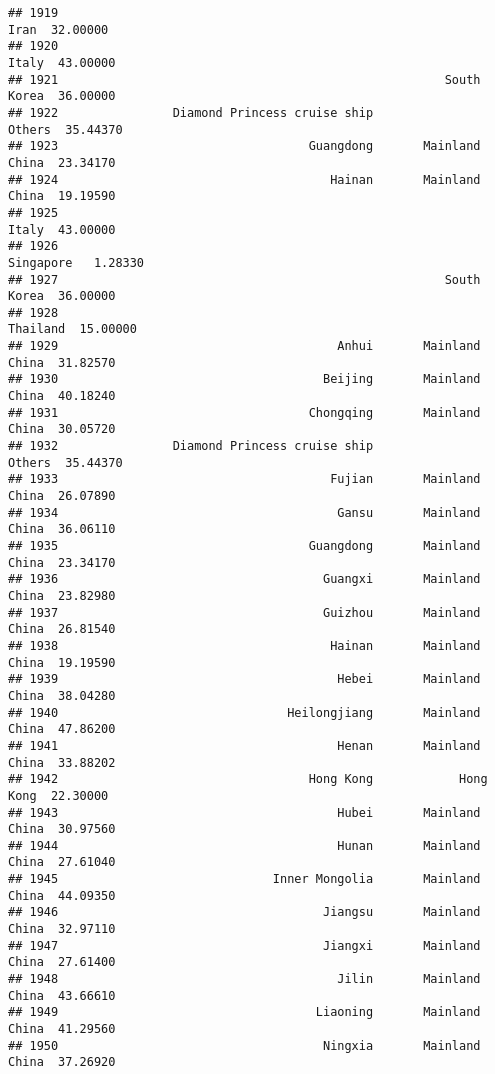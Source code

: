 \documentclass[
]{article}
\begin{document}
\begin{verbatim}
## 1919                                                             Iran  32.00000
## 1920                                                            Italy  43.00000
## 1921                                                      South Korea  36.00000
## 1922                Diamond Princess cruise ship               Others  35.44370
## 1923                                   Guangdong       Mainland China  23.34170
## 1924                                      Hainan       Mainland China  19.19590
## 1925                                                            Italy  43.00000
## 1926                                                        Singapore   1.28330
## 1927                                                      South Korea  36.00000
## 1928                                                         Thailand  15.00000
## 1929                                       Anhui       Mainland China  31.82570
## 1930                                     Beijing       Mainland China  40.18240
## 1931                                   Chongqing       Mainland China  30.05720
## 1932                Diamond Princess cruise ship               Others  35.44370
## 1933                                      Fujian       Mainland China  26.07890
## 1934                                       Gansu       Mainland China  36.06110
## 1935                                   Guangdong       Mainland China  23.34170
## 1936                                     Guangxi       Mainland China  23.82980
## 1937                                     Guizhou       Mainland China  26.81540
## 1938                                      Hainan       Mainland China  19.19590
## 1939                                       Hebei       Mainland China  38.04280
## 1940                                Heilongjiang       Mainland China  47.86200
## 1941                                       Henan       Mainland China  33.88202
## 1942                                   Hong Kong            Hong Kong  22.30000
## 1943                                       Hubei       Mainland China  30.97560
## 1944                                       Hunan       Mainland China  27.61040
## 1945                              Inner Mongolia       Mainland China  44.09350
## 1946                                     Jiangsu       Mainland China  32.97110
## 1947                                     Jiangxi       Mainland China  27.61400
## 1948                                       Jilin       Mainland China  43.66610
## 1949                                    Liaoning       Mainland China  41.29560
## 1950                                     Ningxia       Mainland China  37.26920

\end{verbatim}
\end{document}

